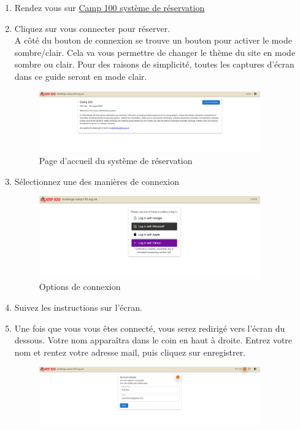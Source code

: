 \documentclass[a4paper, 11pt]{report}
\begin{document}
\begin{enumerate}
    \item Rendez vous sur \href{https://bookings.camp100.org.ukj}{Camp 100 syst\`eme de r\'eservation}
    \item Cliquez sur vous connecter pour r\'eserver.\\
    A côt\'e du bouton de connexion se trouve un bouton pour activer le mode sombre/clair. Cela va vous permettre de changer le th\`eme du site en mode sombre ou clair. Pour des raisons de simplicit\'e, toutes les captures d'\'ecran dans ce guide seront en mode clair. 
    \begin{figure}[H]
        \centering
        \includegraphics[width=0.9\textwidth]{assets/1-homepage.png}
        \caption{Page d'accueil du syst\`eme de r\'eservation}
    \end{figure}
    \item S\'electionnez une des mani\`eres de connexion
    \begin{figure}[H]
        \centering
        \includegraphics[width=0.9\textwidth]{assets/1-login.png}
        \caption{Options de connexion}
    \end{figure}
    \item Suivez les instructions sur l'\'ecran.
    \item Une fois que vous vous \^etes connect\'e, vous serez redirig\'e vers l'\'ecran du dessous. Votre nom apparaîtra dans le coin en haut \`a droite. Entrez votre nom et rentez votre adresse mail, puis cliquez sur enregistrer.
    \begin{figure}[H]
        \centering
        \includegraphics[width=0.9\textwidth]{assets/1-create-account.png}

\end{figure}
\end{enumerate}
\end{document}

